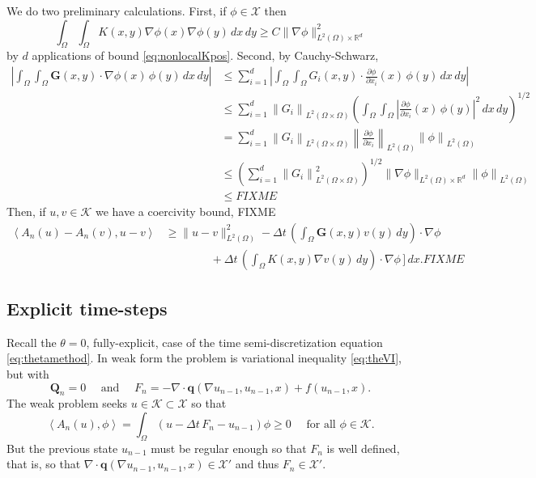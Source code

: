 \documentclass[final,leqno,onefignum,onetabnum]{siamltex1213bueler}
\newcommand\bG{\mathbf{G}}
\newcommand\bq{\mathbf{q}}
\newcommand\bQ{\mathbf{Q}}
\newcommand{\Div}{\nabla\cdot}
\renewcommand{\grad}{\nabla}
\newcommand{\ip}[2]{\ensuremath{\left<#1,#2\right>}}
\newcommand\RR{\mathbb{R}}
\begin{document}
We do two preliminary calculations.  First, if $\phi\in\mathcal{X}$ then
\begin{equation*}
  \int_\Omega \int_\Omega K(x,y) \grad \phi(x) \grad \phi(y)\,dx\,dy \ge C \|\grad\phi\|_{L^2(\Omega)\times \RR^d}^2
\end{equation*}
by $d$ applications of bound \eqref{eq:nonlocalKpos}.  Second, by Cauchy-Schwarz,
\begin{align*}
\left|\int_\Omega \int_\Omega \bG(x,y) \cdot \grad \phi(x)\,\phi(y) \,dx\,dy\right| &\le \sum_{i=1}^d \left|\int_\Omega \int_\Omega G_i(x,y) \cdot \frac{\partial \phi}{\partial x_i} (x)\,\phi(y) \,dx\,dy\right| \\
  &\le \sum_{i=1}^d \left\|G_i\right\|_{L^2(\Omega \times \Omega)} \left(\int_\Omega \int_\Omega \left|\frac{\partial \phi}{\partial x_i} (x)\,\phi(y)\right|^2 \,dx\,dy\right)^{1/2} \\
  &= \sum_{i=1}^d \left\|G_i\right\|_{L^2(\Omega \times \Omega)} \left\|\frac{\partial \phi}{\partial x_i}\right\|_{L^2(\Omega)} \left\|\phi\right\|_{L^2(\Omega)} \\
  &\le \left(\sum_{i=1}^d \left\|G_i\right\|_{L^2(\Omega \times \Omega)}^2\right)^{1/2} \|\grad \phi\|_{L^2(\Omega)\times \RR^d} \left\|\phi\right\|_{L^2(\Omega)} \\
  &\le FIXME
\end{align*}
Then, if $u,v\in\mathcal{K}$ we have a coercivity bound, FIXME
\begin{align*}
    \ip{A_n(u)-A_n(v)}{u-v} &\ge \|u-v\|_{L^2(\Omega)}^2 - \Delta t\,\left(\int_\Omega \bG(x,y) v(y)\,dy\right)\cdot \grad \phi \\
                      &\qquad\qquad + \Delta t\,\left(\int_\Omega K(x,y) \grad v(y)\,dy\right)\cdot \grad \phi\,\bigg]\,dx. FIXME
\end{align*}


\subsection{Explicit time-steps} \label{subsec:explicit}  Recall the $\theta=0$, fully-explicit, case of the time semi-discretization equation \eqref{eq:thetamethod}.  In weak form the problem is variational inequality \eqref{eq:theVI}, but with
    $$\bQ_n=0 \quad \text{ and } \quad F_n = - \Div \bq(\grad u_{n-1},u_{n-1},x) + f(u_{n-1},x).$$
The weak problem seeks $u\in\mathcal{K} \subset \mathcal{X}$ so that
\begin{equation}
\ip{A_n(u)}{\phi} = \int_\Omega (u - \Delta t\,F_n - u_{n-1})\phi \ge 0 \quad \text{ for all } \phi \in \mathcal{K}.  \label{eq:explicitweakstep}
\end{equation}
But the previous state $u_{n-1}$ must be regular enough so that $F_n$ is well defined, that is, so that $\Div \bq(\grad u_{n-1},u_{n-1},x) \in \mathcal{X}'$ and thus $F_n\in\mathcal{X}'$.
\end{document}
